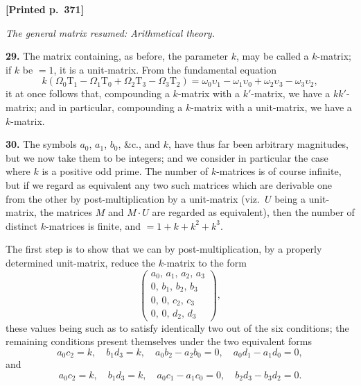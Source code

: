 \documentclass[11pt]{article}
\begin{document}
\medskip
\noindent\textbf{[Printed p.~371]}\hfill

\medskip
\begin{center}\textit{The general matrix resumed: Arithmetical theory.}\end{center}

\noindent\textbf{29.} The matrix containing, as before, the parameter $k$, may be called a $k$-matrix; if $k$ be $=1$, it is a unit-matrix. From the fundamental equation
\[
k(\Omega_{0}\mathrm{T}_{1}-\Omega_{1}\mathrm{T}_{0}+\Omega_{2}\mathrm{T}_{3}-\Omega_{3}\mathrm{T}_{2})=\omega_{0}\upsilon_{1}-\omega_{1}\upsilon_{0}+\omega_{2}\upsilon_{3}-\omega_{3}\upsilon_{2},
\]
it at once follows that, compounding a $k$-matrix with a $k'$-matrix, we have a $kk'$-matrix; and in particular, compounding a $k$-matrix with a unit-matrix, we have a $k$-matrix.

\medskip
\noindent\textbf{30.} The symbols $a_{0}$, $a_{1}$, $b_{0}$, \&c., and $k$, have thus far been arbitrary magnitudes, but we now take them to be integers; and we consider in particular the case where $k$ is a positive odd prime. The number of $k$-matrices is of course infinite, but if we regard as equivalent any two such matrices which are derivable one from the other by post-multiplication by a unit-matrix (viz.\ $U$ being a unit-matrix, the matrices $M$ and $M\cdot U$ are regarded as equivalent), then the number of distinct $k$-matrices is finite, and $=1+k+k^{2}+k^{3}$.

The first step is to show that we can by post-multiplication, by a properly determined unit-matrix, reduce the $k$-matrix to the form
\[
\begin{pmatrix}a_{0},\,a_{1},\,a_{2},\,a_{3}\\ 0,\,b_{1},\,b_{2},\,b_{3}\\ 0,\,0,\,c_{2},\,c_{3}\\ 0,\,0,\,d_{2},\,d_{3}\end{pmatrix},
\]
these values being such as to satisfy identically two out of the six conditions; the remaining conditions present themselves under the two equivalent forms
\[
a_{0}c_{2}=k,\quad b_{1}d_{3}=k,\quad a_{0}b_{2}-a_{2}b_{0}=0,\quad a_{0}d_{1}-a_{1}d_{0}=0,
\]
and
\[
a_{0}c_{2}=k,\quad b_{1}d_{3}=k,\quad a_{0}c_{1}-a_{1}c_{0}=0,\quad b_{2}d_{3}-b_{3}d_{2}=0.
\]
\end{document}
